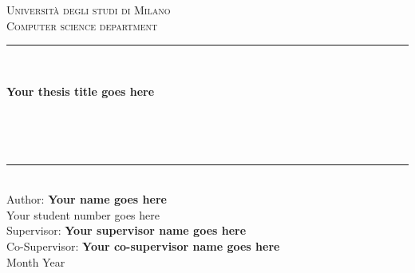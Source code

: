 \documentclass[\main/main.tex]{subfiles}
\begin{document}
\pagestyle{empty} %
\begin{titlepage}
	\begin{center}
		\vfill
		{\large \scshape Università degli studi di Milano}\\[0.1cm]
		{\large \scshape Computer science department}\\[0.5cm]
		\rule{\textwidth}{1.5pt}\\[0cm]
		{\huge \bfseries  Your thesis title goes here \par \ }\\[-0.5cm]
		\rule{\textwidth}{1.5pt}\\[2.5cm]
		{\hfill \large Author: \textbf{Your name goes here}} \\
		\vspace{0.1cm}
		{\hfill \large Your student number goes here} \\
		\vspace{0.5cm}
		{\hfill \large Supervisor: \textbf{Your supervisor name goes here}} \\
	    {\hfill \large Co-Supervisor: \textbf{Your co-supervisor name goes here} \\}
	    \vspace{1cm}
		\hfill  Month Year
	\end{center}
\end{titlepage}
\end{document}
